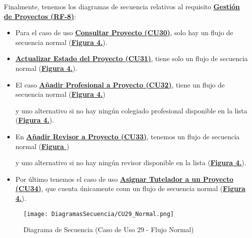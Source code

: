 Finalmente, tenemos los diagramas de secuencia relativos al requisito \textbf{\hyperref[tab:rfGestProyectos]{Gestión de Proyectos (RF-8)}}:
\begin{itemize}
  \item \addtocounter{figura_cap4}{1} Para el caso de uso \textbf{\hyperref[tab:curConsultarProyectos]{Consultar Proyecto (CU30)}}, solo hay un flujo de secuencia normal (\textbf{\hyperref[fig:Secuencia_CU30_Normal]{Figura 4.}}).
  \item \addtocounter{figura_cap4}{1} \textbf{\hyperref[tab:curActualizarProyecto]{Actualizar Estado del Proyecto (CU31)}}, tiene solo un flujo de secuencia normal (\textbf{\hyperref[fig:Secuencia_CU31_Normal]{Figura 4.}}).
  \item \addtocounter{figura_cap4}{1} El caso \textbf{\hyperref[tab:curAsignarProfProyecto]{Añadir Profesional a Proyecto (CU32)}}, tiene un flujo de secuencia normal (\textbf{\hyperref[fig:Secuencia_CU32_Normal]{Figura 4.}}) \addtocounter{figura_cap4}{1} y uno alternativo si no hay ningún colegiado profesional disponible en la lista (\textbf{\hyperref[fig:Secuencia_CU32_Alt1]{Figura 4.}}).
  \item \addtocounter{figura_cap4}{1} En \textbf{\hyperref[tab:curAsignarRevisorProyecto]{Añadir Revisor a Proyecto (CU33)}}, tenemos un flujo de secuencia normal (\textbf{\hyperref[fig:Secuencia_CU33_Normal]{Figura }}) \addtocounter{figura_cap4}{1} y uno alternativo si no hay ningún revisor disponible en la lista (\textbf{\hyperref[fig:Secuencia_CU33_Alt1]{Figura 4.}}).
  \item \addtocounter{figura_cap4}{1} Por último tenemos el caso de uso \textbf{\hyperref[tab:curAsignarTutela]{Asignar Tutelador a un Proyecto (CU34)}}, que cuenta únicamente coun un flujo de secuencia normal (\textbf{\hyperref[fig:Secuencia_CU34_Normal]{Figura 4.}}).
\end{itemize}

\begin{landscape}
  \begin{figure}[!htbp]
    \centering
    \texttt{[image: DiagramasSecuencia/CU29\_Normal.png]}
    \caption{Diagrama de Secuencia (Caso de Uso 29 - Flujo Normal)}
    \label{fig:Secuencia_CU29_Normal}
  \end{figure}
\end{landscape}
\FloatBarrier

